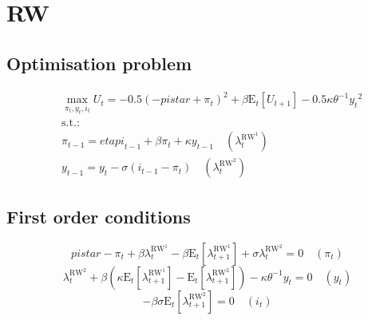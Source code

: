 

\section{RW}

\subsection{Optimisation problem}

\begin{align}
&\max_{\pi_{t}, y_{t}, i_{t}
} U_{t} = -0.5\left(-{p\!i\!s\!t\!a\!r} + \pi_{t}\right)^{2} + {\beta} {\mathrm{E}_{t}\left[U_{t+1}\right]} - 0.5{\kappa} {\theta}^{-1} {y_{t}}^{2}\\
&\mathrm{s.t.:}\nonumber\\
& \pi_{t-1} = {e\!t\!a\!p\!i}_{t-1} + {\beta} {\pi_{t}} + {\kappa} {y_{t-1}} \quad \left(\lambda^{\mathrm{RW}^{\mathrm{1}}}_{t}\right)\\
& y_{t-1} = y_{t} - {\sigma} \left(i_{t-1} - \pi_{t}\right) \quad \left(\lambda^{\mathrm{RW}^{\mathrm{2}}}_{t}\right)
\end{align}


\subsection{First order conditions}

\begin{equation}
{p\!i\!s\!t\!a\!r} - \pi_{t} + {\beta} {\lambda^{\mathrm{RW}^{\mathrm{1}}}_{t}} - {\beta} {\mathrm{E}_{t}\left[\lambda^{\mathrm{RW}^{\mathrm{1}}}_{t+1}\right]} + {\sigma} {\lambda^{\mathrm{RW}^{\mathrm{2}}}_{t}} = 0
 \quad \left(\pi_{t}\right)
\end{equation}
\begin{equation}
\lambda^{\mathrm{RW}^{\mathrm{2}}}_{t} + {\beta} \left({\kappa} {\mathrm{E}_{t}\left[\lambda^{\mathrm{RW}^{\mathrm{1}}}_{t+1}\right]} - \mathrm{E}_{t}\left[\lambda^{\mathrm{RW}^{\mathrm{2}}}_{t+1}\right]\right) - {\kappa} {\theta}^{-1} {y_{t}} = 0
 \quad \left(y_{t}\right)
\end{equation}
\begin{equation}
-{\beta} {\sigma} {\mathrm{E}_{t}\left[\lambda^{\mathrm{RW}^{\mathrm{2}}}_{t+1}\right]} = 0
 \quad \left(i_{t}\right)
\end{equation}




